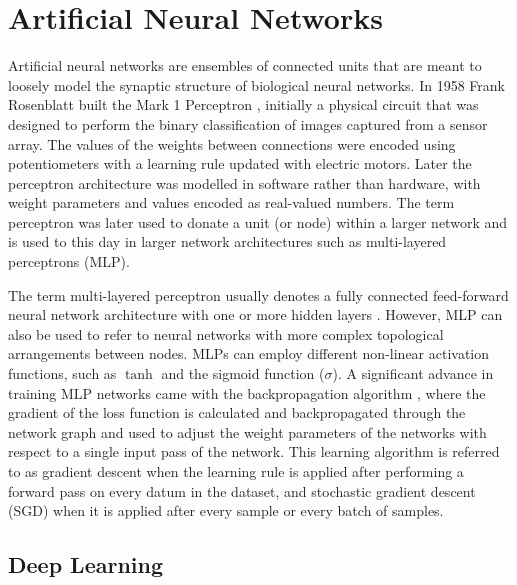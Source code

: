 \section{Artificial Neural Networks}

Artificial neural networks are ensembles of connected units that are meant to loosely model the synaptic structure of biological neural networks. 
In 1958 Frank Rosenblatt built the Mark 1 Perceptron \citep{rosenblatt1958perceptron}, initially a physical circuit that was designed to perform the binary classification of images captured from a sensor array. 
The values of the weights between connections were encoded using potentiometers with a learning rule updated with electric motors. 
Later the perceptron architecture was modelled in software rather than hardware, with weight parameters and values encoded as real-valued numbers. 
The term perceptron was later used to donate a unit (or node) within a larger network and is used to this day in larger network architectures such as multi-layered perceptrons (MLP). 

The term multi-layered perceptron usually denotes a fully connected feed-forward neural network architecture with one or more hidden layers \citep{rosenblatt1958perceptron}. 
However, MLP can also be used to refer to neural networks with more complex topological arrangements between nodes. 
MLPs can employ different non-linear activation functions, such as $\tanh$ and the sigmoid function ($\sigma$). 
A significant advance in training MLP networks came with the backpropagation algorithm \citep{werbos1974beyond}, where the gradient of the loss function is calculated and backpropagated through the network graph and used to adjust the weight parameters of the networks with respect to a single input pass of the network. 
This learning algorithm is referred to as gradient descent when the learning rule is applied after performing a forward pass on every datum in the dataset, and stochastic gradient descent (SGD) when it is applied after every sample or every batch of samples. 

\subsection{Deep Learning}

